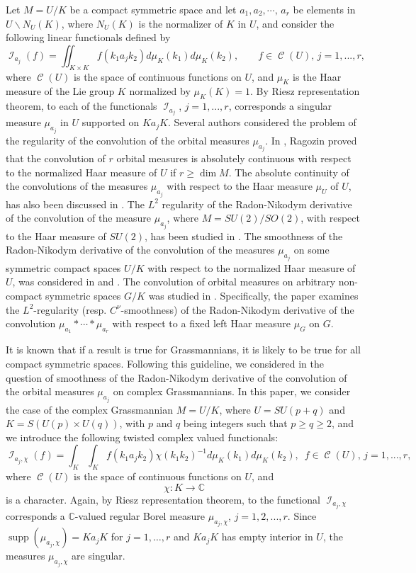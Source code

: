 \documentclass[11pt,a4paper]{amsart}
\DeclareMathOperator{\C}{\mathcal{C}}
\DeclareMathOperator{\I}{\mathcal{I}}
\DeclareMathOperator{\supp}{supp}
\theoremstyle{definition}
\numberwithin{equation}{section}
\begin{document}
Let $M=U/K$ be a compact symmetric space and let 
$a_1, a_2, \cdots, \, a_r $ be elements in $U\backslash N_U(K)$, where $N_U(K)$ is the normalizer of $K$ in $U$, and consider the following linear functionals
defined by
\[ \I_{a_j}\left(f \right) =\iint_{K\times K} f\left(k_1a_jk_2 \right) d\mu_K \left(k_1\right)d\mu_K\left( k_2\right),  \;\;\;\;\;\;\; f\in \C(U)    , \,j=1,...,r,\]
where $\C\left(U\right)$ is the  space of continuous functions on $U$, and $\mu_K$ is the Haar measure of the Lie group $K$ normalized by ${ \mu_K\left(K \right)} =1$.  By Riesz representation theorem, to each of the functionals $\I_{a_j}$, $j=1,...,r$, corresponds a singular measure $\mu_{a_j}$ in $U$  supported on $Ka_jK$. Several authors considered the problem of the regularity of the convolution of the orbital measures $\mu_{a_j}$. In \cite{RaZonal}, Ragozin proved that the convolution of $r$ orbital measures is absolutely continuous with respect to the normalized  Haar measure of $U$ if $r \geq \dim M$.
 The absolute continuity of the convolutions of the  measures \(\mu_{a_j}\)  with respect to the Haar measure \(\mu_U\) of \(U\),  has also been discussed in \cite{AG}.
  The \(L^2\) regularity of the Radon-Nikodym derivative of the convolution of the measure  \(\mu_{a_j}\), where $M=SU(2)/SO(2)$,  with respect to the Haar measure of $SU(2)$, has been studied in \cite{AGP}.  
The smoothness of the Radon-Nikodym derivative of the convolution of the measures \(\mu_{a_j}\) on some symmetric compact spaces   $U/K$  with respect to the normalized Haar measure of \(U\),   was considered in \cite{Alhashami} and \cite{anchouche2}.  
  The convolution of orbital measures on arbitrary non-compact symmetric spaces $G/K$ was studied in \cite{anchouche-noncompact case}. Specifically, the paper examines the  $L^2$-regularity (resp. $C^\nu$-smoothness) of the Radon-Nikodym derivative of the convolution $\mu_{a_1}\ast\cdots \ast\mu_{a_r}$ with respect to a fixed left Haar measure $\mu_G$ on $G$.

It is known that if a result is true for Grassmannians, it is likely to be true for all compact symmetric spaces. Following this guideline, we considered in \cite{Alhashami} the question of smoothness of the Radon-Nikodym derivative of the convolution of the orbital measures $\mu_{a_j}$ on complex Grassmannians.  In this paper, we consider the case of the complex Grassmannian $M=U/K$, where $U=SU\left(p+q \right) $ and $K=S\left(U(p)\times U(q) \right) $, with $p$ and 
$q$ being integers such that $p\geq q\geq 2$, and we introduce the following twisted complex valued functionals: 
$$
\I_{a_j,\chi}\left(f \right)=\int_K\int_K f\left(k_1a_jk_2 \right)\chi(k_1k_2)^{-1}  d\mu_K(k_1) d\mu_K(k_2), \, \, \,  f \in \C \left(U \right) , \,j=1,...,r,
$$
where $\C\left(U\right)$ is the  space of continuous functions on $U$,  
and $$
\chi: K \longrightarrow \mathbb{C}
$$
is a character. Again, by Riesz representation theorem, to the functional $\I_{a_j,\chi}$ corresponds a $\mathbb{C}$-valued regular Borel measure $\mu_{a_j, \chi}$, $j=1,2,...,r$. 
Since \\$\supp(\mu_{a_j,\chi}) = Ka_jK$ for $j=1,\dots,r$ 
and $Ka_jK$ has empty interior in $U$, 
the measures $\mu_{a_j,\chi}$ are singular. 
\end{document}
